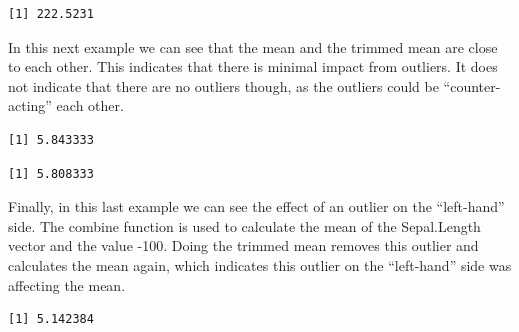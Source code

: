 \documentclass[
  letterpaper,
  DIV=11,
  numbers=noendperiod]{scrreprt}
\newenvironment{Shaded}{\begin{snugshade}}{\end{snugshade}}
\newcommand{\AttributeTok}[1]{\textcolor[rgb]{0.40,0.45,0.13}{#1}}
\newcommand{\DecValTok}[1]{\textcolor[rgb]{0.68,0.00,0.00}{#1}}
\newcommand{\FunctionTok}[1]{\textcolor[rgb]{0.28,0.35,0.67}{#1}}
\newcommand{\NormalTok}[1]{\textcolor[rgb]{0.00,0.23,0.31}{#1}}
\newcommand{\SpecialCharTok}[1]{\textcolor[rgb]{0.37,0.37,0.37}{#1}}
\begin{document}
\begin{verbatim}
[1] 222.5231
\end{verbatim}

In this next example we can see that the mean and the trimmed mean are
close to each other. This indicates that there is minimal impact from
outliers. It does not indicate that there are no outliers though, as the
outliers could be ``counter-acting'' each other.

\begin{Shaded}
\end{Shaded}

\begin{verbatim}
[1] 5.843333
\end{verbatim}

\begin{Shaded}
\end{Shaded}

\begin{verbatim}
[1] 5.808333
\end{verbatim}

Finally, in this last example we can see the effect of an outlier on the
``left-hand'' side. The combine function is used to calculate the mean
of the Sepal.Length vector and the value -100. Doing the trimmed mean
removes this outlier and calculates the mean again, which indicates this
outlier on the ``left-hand'' side was affecting the mean.

\begin{Shaded}
\end{Shaded}

\begin{verbatim}
[1] 5.142384
\end{verbatim}

\begin{Shaded}
\end{Shaded}
\end{document}
